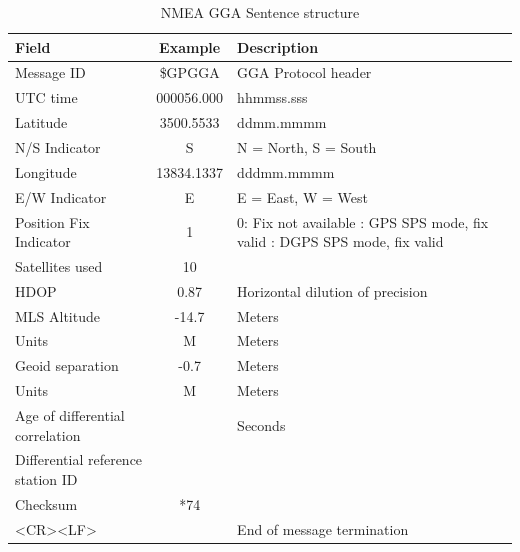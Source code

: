 \renewcommand{\arraystretch}{1.2}
\begin{table}[H]
    \begin{center}
        \caption{NMEA GGA Sentence structure}
        \label{tab:NMEA GGA Struct}
        \begin{tabular}{ |m{4cm}|c|p{6cm}| }
            \hline
            \textbf{Field} & \textbf{Example} & \textbf{Description} \\
            \hline
            Message ID & \$GPGGA & GGA Protocol header \\
            \hline
            UTC time & 000056.000 & hhmmss.sss \\
            \hline
            Latitude & 3500.5533 & ddmm.mmmm \\
            \hline
            N/S Indicator & S & N = North, S = South\\
            \hline
            Longitude & 13834.1337 & dddmm.mmmm \\
            \hline
            E/W Indicator & E & E = East, W = West\\
            \hline
            Position Fix Indicator & 1 & 0: Fix not available \newline 1: GPS SPS mode, fix valid \newline 2: DGPS SPS mode, fix valid\\
            \hline
            Satellites used & 10 & \\
            \hline
            HDOP & 0.87 & Horizontal dilution of precision\\
            \hline
            MLS Altitude & -14.7 & Meters \\
            \hline
            Units & M & Meters \\
            \hline
            Geoid separation & -0.7 & Meters \\
            \hline
            Units & M & Meters\\
            \hline
            Age of differential correlation & & Seconds\\
            \hline
            Differential reference station ID & &  \\
            \hline
            Checksum & *74 &  \\
            \hline
            <CR><LF> & & End of message termination \\
            \hline
        \end{tabular}
    \end{center}
\end{table}
\renewcommand{\arraystretch}{1}


